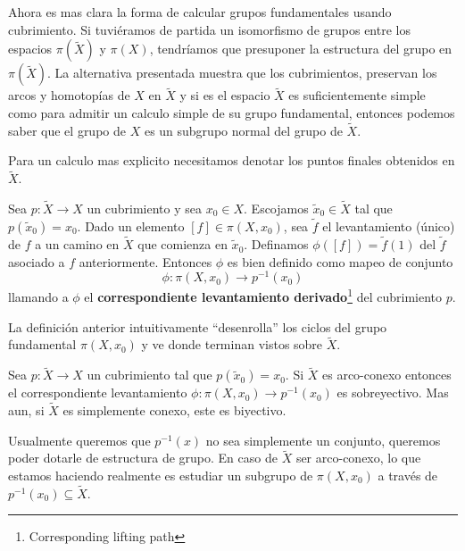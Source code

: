 Ahora es mas clara la forma de calcular grupos fundamentales usando
cubrimiento. Si tuviéramos de partida un isomorfismo de grupos
entre los espacios \(\pi (\tilde X)\) y \(\pi (X)\), tendríamos que
presuponer la estructura del grupo en \(\pi (\tilde X)\). La alternativa
presentada muestra que los cubrimientos, preservan los arcos y
homotopías de \(X\) en \(\tilde X\) y si es el espacio \(\tilde X\) es
suficientemente simple como para admitir un calculo simple de su grupo
fundamental, entonces podemos saber que el grupo de \(X\) es un subgrupo
normal del grupo de \(\tilde X\).

Para un calculo mas explicito necesitamos denotar los puntos finales
obtenidos en \(\tilde X\).
\begin{definicion}
  Sea \(p : \tilde X \to X\) un cubrimiento y sea \(x_0 \in X\).
  Escojamos \(\tilde x _0 \in \tilde X\) tal que \(p(\tilde x _0) =
  x_0\). Dado un elemento \([f] \in \pi (X, x_0)\), sea \(\tilde f\) el
  levantamiento (único) de \(f\) a un camino en \(\tilde X\) que
  comienza en \(\tilde x _0\). Definamos \(\phi ([f]) = \tilde f (1)\) del
  \(\tilde f\) asociado a \(f\) anteriormente. Entonces \(\phi\) es bien
  definido como mapeo de conjunto
  \[ \phi : \pi (X, x_0) \longrightarrow p^{-1} (x_0)\]
  llamando a \(\phi\) el \textbf{correspondiente levantamiento
  derivado}\footnote{Corresponding lifting path} del cubrimiento \(p\).
\end{definicion}
La definición anterior intuitivamente ``desenrolla'' los ciclos del
grupo fundamental \(\pi (X,x_0)\) y ve donde terminan vistos sobre
\(\tilde X\).
\begin{teorema}
  Sea \(p : \tilde X \to X\) un cubrimiento tal que \(p (\tilde x _0) =
  x_0\). Si \(\tilde X\) es arco-conexo entonces el correspondiente
  levantamiento \(\phi : \pi (X, x _0) \to p^{-1} (x_0)\) es
  sobreyectivo. Mas aun, si \(\tilde X\) es simplemente conexo, este es
  biyectivo.
\end{teorema}
Usualmente queremos que \(p^{-1} (x)\) no sea simplemente un conjunto,
queremos poder dotarle de estructura de grupo. En caso de \(\tilde X\)
ser arco-conexo, lo que estamos haciendo realmente es estudiar un
subgrupo de \(\pi \left( X, x_0 \right)\) a través de \(p^{-1}(x_0)
\subseteq \tilde X\).
